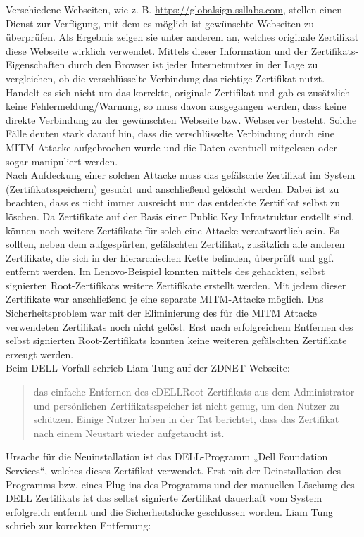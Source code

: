 \noindent
Verschiedene Webseiten, wie z. B. \url{https://globalsign.ssllabs.com}, stellen einen Dienst zur Verfügung, mit dem es möglich ist gewünschte Webseiten zu überprüfen. Als Ergebnis zeigen sie unter anderem an, welches originale Zertifikat diese Webseite wirklich verwendet. Mittels dieser Information und der Zertifikats-Eigenschaften durch den Browser ist jeder Internetnutzer in der Lage zu vergleichen, ob die verschlüsselte Verbindung das richtige Zertifikat nutzt. Handelt es sich nicht um das korrekte, originale Zertifikat und gab es zusätzlich keine Fehlermeldung/Warnung, so muss davon ausgegangen werden, dass keine direkte Verbindung zu der gewünschten Webseite bzw. Webserver besteht. Solche Fälle deuten stark darauf hin, dass die verschlüsselte Verbindung durch eine MITM-Attacke aufgebrochen wurde und die Daten eventuell mitgelesen oder sogar manipuliert werden. 
\\Nach Aufdeckung einer solchen Attacke muss das gefälschte Zertifikat im System (Zertifikatsspeichern) gesucht und anschließend gelöscht werden. Dabei ist zu beachten, dass es nicht immer ausreicht nur das entdeckte Zertifikat selbst zu löschen. Da Zertifikate auf der Basis einer Public Key Infrastruktur \cite[vgl.]{x.509} erstellt sind, können noch weitere Zertifikate für solch eine Attacke verantwortlich sein. Es sollten, neben dem aufgespürten, gefälschten Zertifikat, zusätzlich alle anderen Zertifikate, die sich in der hierarchischen Kette befinden, überprüft und ggf. entfernt werden. Im Lenovo-Beispiel konnten mittels des gehackten, selbst signierten Root-Zertifikats weitere Zertifikate erstellt werden. Mit jedem dieser Zertifikate war anschließend je eine separate MITM-Attacke möglich. Das Sicherheitsproblem war mit der Eliminierung des für die MITM Attacke verwendeten Zertifikats noch nicht gelöst. Erst nach erfolgreichem Entfernen des selbst signierten Root-Zertifikats konnten keine weiteren gefälschten Zertifikate erzeugt werden.\\
Beim DELL-Vorfall schrieb Liam Tung auf der ZDNET-Webseite: 
\begin{quote}
	\glqq [...] das einfache Entfernen des eDELLRoot-Zertifikats aus dem Administrator und persönlichen Zertifikatsspeicher ist nicht genug, um den Nutzer zu schützen. Einige Nutzer haben in der Tat berichtet, dass das Zertifikat nach einem Neustart wieder aufgetaucht ist.\grqq \cite{zdnet}	
\end{quote}
Ursache für die Neuinstallation ist das DELL-Programm „Dell Foundation Services“, welches dieses Zertifikat verwendet. Erst mit der Deinstallation des Programms bzw. eines Plug-ins des Programms und der manuellen Löschung des DELL Zertifikats ist das selbst signierte Zertifikat dauerhaft vom System erfolgreich entfernt und die Sicherheitslücke geschlossen worden. Liam Tung schrieb zur korrekten Entfernung: 

